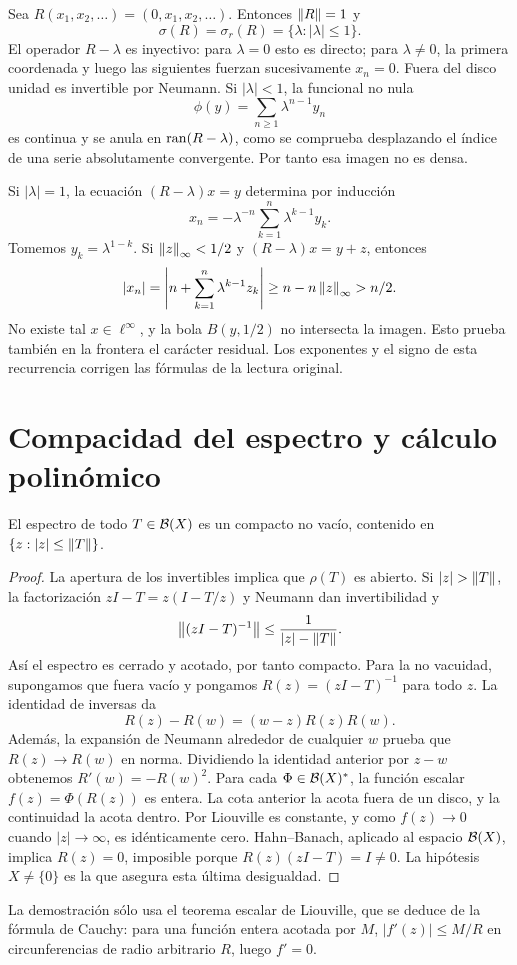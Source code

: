 \begin{ejemplo}\label{v3:shift-infinito}
Sea $R(x_1,x_2,\ldots)=(0,x_1,x_2,\ldots)$. Entonces $\left\lVert R\right\rVert=1$ y
\[\sigma(R)=\sigma_r(R)=\{\lambda:|\lambda|\le1\}.
\]
El operador $R-\lambda$ es inyectivo: para $\lambda=0$ esto es directo; para $\lambda\ne0$, la primera coordenada y luego las siguientes fuerzan sucesivamente $x_n=0$. Fuera del disco unidad es invertible por Neumann. Si $|\lambda|<1$, la funcional no nula
\[\phi(y)=\sum_{n\ge1}\lambda^{n-1}y_n
\]
es continua y se anula en $\operatorname{ran}(R-\lambda)$, como se comprueba desplazando el índice de una serie absolutamente convergente. Por tanto esa imagen no es densa.

Si $|\lambda|=1$, la ecuación $(R-\lambda)x=y$ determina por inducción
\[x_n=-\lambda^{-n}\sum_{k=1}^n\lambda^{k-1}y_k.
\]
Tomemos $y_k=\lambda^{1-k}$. Si $\left\lVert z\right\rVert_\infty<1/2$ y $(R-\lambda)x=y+z$, entonces
\[|x_n|=\left|n+\sum_{k=1}^n\lambda^{k-1}z_k\right|
\ge n-n\left\lVert z\right\rVert_\infty>n/2.
\]
No existe tal $x\in\ell^\infty$, y la bola $B(y,1/2)$ no intersecta la imagen. Esto prueba también en la frontera el carácter residual. Los exponentes y el signo de esta recurrencia corrigen las fórmulas de la lectura original.
\end{ejemplo}

\section{Compacidad del espectro y cálculo polinómico}\label{lec:v3-08}
\begin{teorema}\label{v3:espectro-compacto}
El espectro de todo $T\in\mathcal B(X)$ es un compacto no vacío, contenido en $\{z:|z|\le\left\lVert T\right\rVert\}$.
\end{teorema}
\begin{proof}
La apertura de los invertibles implica que $\rho(T)$ es abierto. Si $|z|>\norm T$, la factorización $zI-T=z(I-T/z)$ y Neumann dan invertibilidad y
\[\left\lVert(zI-T)^{-1}\right\rVert\le\frac1{|z|-\left\lVert T\right\rVert}.
\]
Así el espectro es cerrado y acotado, por tanto compacto. Para la no vacuidad, supongamos que fuera vacío y pongamos $R(z)=(zI-T)^{-1}$ para todo $z$. La identidad de inversas da
\[R(z)-R(w)=(w-z)R(z)R(w).
\]
Además, la expansión de Neumann alrededor de cualquier $w$ prueba que $R(z)\to R(w)$ en norma. Dividiendo la identidad anterior por $z-w$ obtenemos $R'(w)=-R(w)^2$. Para cada $\Phi\in\mathcal B(X)^*$, la función escalar $f(z)=\Phi(R(z))$ es entera. La cota anterior la acota fuera de un disco, y la continuidad la acota dentro. Por Liouville es constante, y como $f(z)\to0$ cuando $|z|\to\infty$, es idénticamente cero. Hahn--Banach, aplicado al espacio $\mathcal B(X)$, implica $R(z)=0$, imposible porque $R(z)(zI-T)=I\ne0$. La hipótesis $X\ne\{0\}$ es la que asegura esta última desigualdad.
\end{proof}
La demostración sólo usa el teorema escalar de Liouville, que se deduce de la fórmula de Cauchy: para una función entera acotada por $M$, $|f'(z)|\le M/R$ en circunferencias de radio arbitrario $R$, luego $f'=0$.

